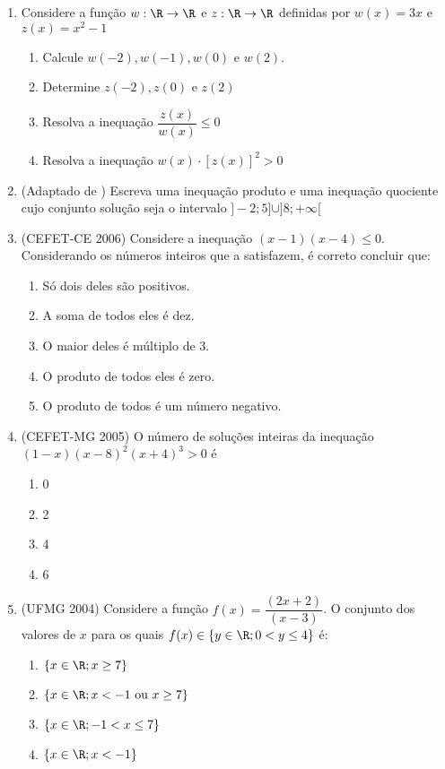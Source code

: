 \begin{enumerate}
\item 

Considere a função $w:\R\to\R$ e $z:\R\to\R$ definidas por $w(x)=3x$ e $z(x)=x^2-1$
\begin{enumerate}
\item Calcule $w(-2), w(-1), w(0)$ e $w(2)$.
\item Determine $z(-2), z(0)$ e $z(2)$
\item Resolva a inequação $\dfrac{z(x)}{w(x)}\leq0$
\item Resolva a inequação $w(x)\cdot[z(x)]^2>0$
\end{enumerate}


\item (Adaptado de \cite{conceicao2011}) Escreva uma inequação produto e uma inequação quociente cujo conjunto solução seja o intervalo $]-2;5]\cup]8;+\infty[$ 

\item (CEFET-CE 2006) Considere a inequação $(x-1)(x-4)\leq0$. Considerando os números inteiros que a satisfazem, é correto concluir que:
\begin{enumerate}
\item Só dois deles são positivos.
\item A soma de todos eles é dez.
\item O maior deles é múltiplo de $3$.
\item O produto de todos eles é zero.
\item O produto de todos é um número negativo.
\end{enumerate}

\clearpage

\item (CEFET-MG 2005) O número de soluções inteiras da inequação $(1-x) (x-8)^2 (x+4)^3 > 0$ é
\begin{enumerate}
\item 0
\item 2
\item 4
\item 6
\end{enumerate}


\item (UFMG 2004) Considere a função $f(x) = \dfrac{(2x+2)}{(x-3)}$. O conjunto dos valores de $x$ para os quais $f(x)\in\{y\in\R;0<y\leq4\}$ é:
\begin{enumerate}
\item $\{x\in\R; x\geq 7\}$
\item $\{x\in\R;x<-1\text{ ou }x\geq7\}$
\item $\{x\in\R;-1<x\leq7\}$
\item $\{x\in\R;x<-1\}$
\end{enumerate}



\end{enumerate}
